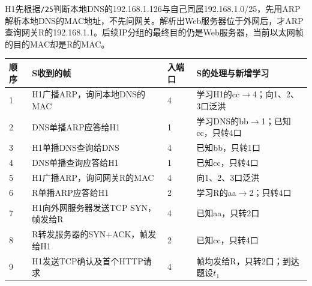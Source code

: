 H1先根据\texttt{/\allowbreak{}25}判断本地DNS的192.168.1.126与自己同属192.168.1.0/25，先用ARP解析本地DNS的MAC地址，不先问网关。解析出Web服务器位于外网后，才ARP查询网关R的192.168.1.1。后续IP分组的最终目的仍是Web服务器，当前以太网帧的目的MAC却是R的MAC。

\begin{wideblock}

\par\medskip\noindent\begin{minipage}{\linewidth}\fontsize{9.3}{12}\selectfont\begin{tabularx}{\linewidth}{@{}YYYY@{}}
\toprule\noalign{}
\begin{minipage}[b]{\linewidth}\raggedright
顺序
\end{minipage} & \begin{minipage}[b]{\linewidth}\raggedright
S收到的帧
\end{minipage} & \begin{minipage}[b]{\linewidth}\raggedleft
入端口
\end{minipage} & \begin{minipage}[b]{\linewidth}\raggedright
S的处理与新增学习
\end{minipage} \\
\midrule\noalign{}


1 & H1广播ARP，询问本地DNS的MAC & 4 & 学习H1的cc\ensuremath{\to}4；向1、2、3口泛洪 \\
2 & DNS单播ARP应答给H1 & 1 & 学习DNS的bb\ensuremath{\to}1；已知cc，只转4口 \\
3 & H1单播DNS查询给DNS & 4 & 已知bb，只转1口 \\
4 & DNS单播查询应答给H1 & 1 & 已知cc，只转4口 \\
5 & H1广播ARP，询问网关R的MAC & 4 & 向1、2、3口泛洪 \\
6 & R单播ARP应答给H1 & 2 & 学习R的aa\ensuremath{\to}2；只转4口 \\
7 & H1向外网服务器发送TCP SYN，帧发给R & 4 & 已知aa，只转2口 \\
8 & R转发服务器的SYN+ACK，帧发给H1 & 2 & 已知cc，只转4口 \\
9 & H1发送TCP确认及首个HTTP请求 & 4 & 帧均发给R，只转2口；到达题设\(t_1\) \\
\bottomrule\end{tabularx}
\end{minipage}\par\medskip

\end{wideblock}


